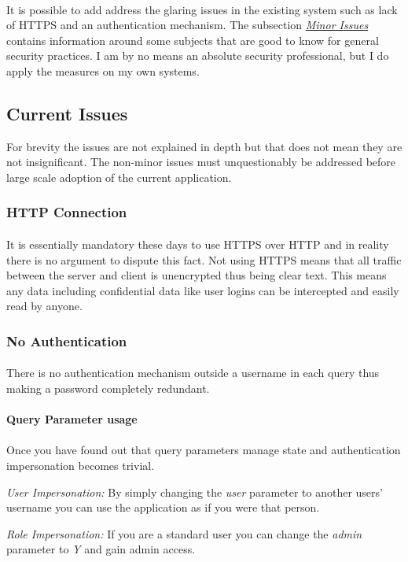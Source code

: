 \paragraph{}
It is possible to add address the glaring issues in the existing system such as lack of HTTPS and an authentication mechanism.
The subsection \hyperref[subsubsec:minor-issues]{\emph{Minor Issues}} contains information around some subjects that are good to know for general security practices.
I am by no means an absolute security professional, but I do apply the measures on my own systems.

\subsection{Current Issues}\label{subsec:current-issue}
For brevity the issues are not explained in depth but that does not mean they are not insignificant.
The non-minor issues must unquestionably be addressed before large scale adoption of the current application.

\subsubsection{HTTP Connection}
\paragraph{}
It is essentially mandatory these days to use HTTPS over HTTP and in reality there is no argument to dispute this fact.
Not using HTTPS means that all traffic between the server and client is unencrypted thus being clear text.
This means any data including confidential data like user logins can be intercepted and easily read by anyone.

\subsubsection{No Authentication}
\paragraph{}
There is no authentication mechanism outside a username in each query thus making a password completely redundant.

\paragraph{Query Parameter usage}
\paragraph{}
Once you have found out that query parameters manage state and authentication impersonation becomes trivial.
\begin{description}
    \item \emph{User Impersonation:} By simply changing the \emph{user} parameter to another users' username you can use the application as
    if you were that person.
    \item \emph{Role Impersonation:} If you are a standard user you can change the \emph{admin} parameter to \emph{Y} and gain admin access.
\end{description}

